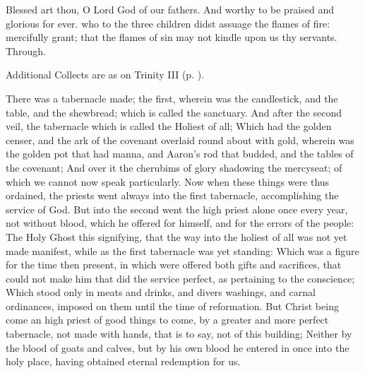Blessed art thou, O Lord God of our fathers. And worthy to be praised and glorious for ever.
\collect
{} who to the three children didst assuage the flames of fire: mercifully grant; that the flames of sin may not kindle upon us thy servants. Through.
\begin{rubric}
    Additional Collects are as on Trinity III (p. \pageref{TrinityIII}).
\end{rubric}

 There was a tabernacle made; the first, wherein was the candlestick, and the table, and the shewbread; which is called the sanctuary. And after the second veil, the tabernacle which is called the Holiest of all; Which had the golden censer, and the ark of the covenant overlaid round about with gold, wherein was the golden pot that had manna, and Aaron's rod that budded, and the tables of the covenant; And over it the cherubims of glory shadowing the mercyseat; of which we cannot now speak particularly. Now when these things were thus ordained, the priests went always into the first tabernacle, accomplishing the service of God. But into the second went the high priest alone once every year, not without blood, which he offered for himself, and for the errors of the people: The Holy Ghost this signifying, that the way into the holiest of all was not yet made manifest, while as the first tabernacle was yet standing: Which was a figure for the time then present, in which were offered both gifts and sacrifices, that could not make him that did the service perfect, as pertaining to the conscience; Which stood only in meats and drinks, and divers washings, and carnal ordinances, imposed on them until the time of reformation. But Christ being come an high priest of good things to come, by a greater and more perfect tabernacle, not made with hands, that is to say, not of this building; Neither by the blood of goats and calves, but by his own blood he entered in once into the holy place, having obtained eternal redemption for us.
